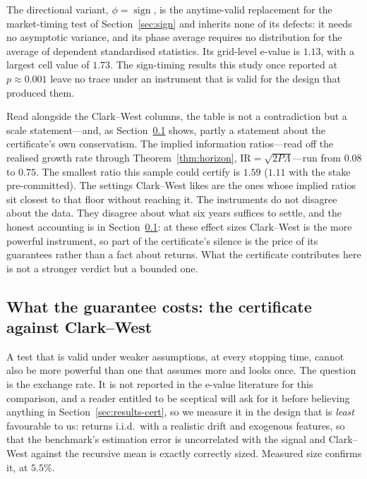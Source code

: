 \documentclass{article}
\theoremstyle{plain}
\theoremstyle{definition}
\begin{document}
The directional variant, $\phi=\operatorname{sign}$, is the anytime-valid replacement for
the market-timing test of Section~\ref{sec:sign} and inherits none of its defects: it needs
no asymptotic variance, and its phase average requires no distribution for the average of
dependent standardised statistics. Its grid-level e-value is $1.13$, with a largest cell value of $1.73$. The sign-timing
results
this study once reported at $p\approx0.001$ leave no trace under an instrument that is
valid for the design that produced them.

Read alongside the Clark--West columns, the table is not a contradiction but a scale
statement---and, as Section~\ref{sec:headtohead} shows, partly a statement about the
certificate's own conservatism. The implied information ratios---read off the realised growth rate through
Theorem~\ref{thm:horizon}, $\mathrm{IR}=\sqrt{2P\Lambda}$---run from $0.08$ to $0.75$. The
smallest ratio this sample could certify is $1.59$ ($1.11$ with the stake pre-committed).
The settings Clark--West likes are the ones whose implied ratios sit closest to that floor
without reaching it. The instruments do not disagree about the data. They disagree about what six years suffices
to settle, and the honest accounting is in Section~\ref{sec:headtohead}: at these effect sizes
Clark--West is the more powerful instrument, so part of the certificate's silence is the price
of its guarantees rather than a fact about returns. What the certificate contributes here is
not a stronger verdict but a bounded one.

\subsection{What the guarantee costs: the certificate against Clark--West}
\label{sec:headtohead}

A test that is valid under weaker assumptions, at every stopping time, cannot also be more
powerful than one that assumes more and looks once. The question is the exchange rate. It is
not reported in the e-value literature for this comparison, and a reader entitled to be
sceptical will ask for it before believing anything in Section~\ref{sec:results-cert}, so we
measure it in the design that is \emph{least} favourable to us: returns i.i.d.\ with a
realistic drift and exogenous features, so that the benchmark's estimation error is
uncorrelated with the signal and Clark--West against the recursive mean is exactly correctly
sized. Measured size confirms it, at $5.5\%$.
\end{document}
